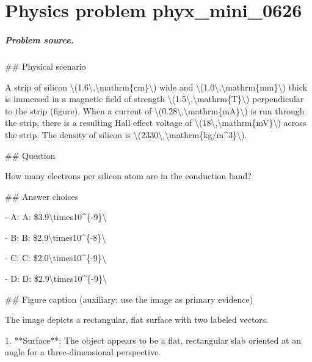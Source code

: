 
\chapter{Physics problem phyx\_mini\_0626}
\label{ch:PhyXMiniProblems_problem_phyx_mini_0626}

\paragraph{Problem source.}
\#\# Physical scenario

A strip of silicon \textbackslash{}(1.6\textbackslash{},\textbackslash{}mathrm\{cm\}\textbackslash{}) wide and \textbackslash{}(1.0\textbackslash{},\textbackslash{}mathrm\{mm\}\textbackslash{}) thick is immersed in a magnetic field of strength \textbackslash{}(1.5\textbackslash{},\textbackslash{}mathrm\{T\}\textbackslash{}) perpendicular to the strip (figure). When a current of \textbackslash{}(0.28\textbackslash{},\textbackslash{}mathrm\{mA\}\textbackslash{}) is run through the strip, there is a resulting Hall effect voltage of \textbackslash{}(18\textbackslash{},\textbackslash{}mathrm\{mV\}\textbackslash{}) across the strip. The density of silicon is \textbackslash{}(2330\textbackslash{},\textbackslash{}mathrm\{kg/m\textasciicircum{}3\}\textbackslash{}).

\#\# Question

How many electrons per silicon atom are in the conduction band?

\#\# Answer choices

- A: A: \$3.9\textbackslash{}times10\textasciicircum{}\{-9\}\textbackslash{}

- B: B: \$2.9\textbackslash{}times10\textasciicircum{}\{-8\}\textbackslash{}

- C: C: \$2.0\textbackslash{}times10\textasciicircum{}\{-9\}\textbackslash{}

- D: D: \$2.9\textbackslash{}times10\textasciicircum{}\{-9\}\textbackslash{}

\#\# Figure caption (auxiliary; use the image as primary evidence)

The image depicts a rectangular, flat surface with two labeled vectors. 

1. **Surface**: The object appears to be a flat, rectangular slab oriented at an angle for a three-dimensional perspective.

